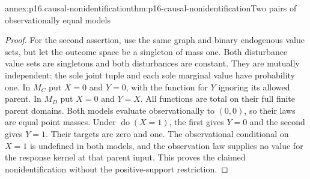 \begin{annexitem}{annex:p16.causal-nonidentification}{thm:p16-causal-nonidentification}{Two pairs of observationally equal models}
\begin{proof}
For the second assertion, use the same graph and binary endogenous value
sets, but let the outcome space be a singleton of mass one. Both
disturbance value sets are singletons and both disturbances are constant.
They are mutually independent: the sole joint tuple and each sole
marginal value have probability one. In \(M_C\) put \(X=0\)
and \(Y=0\), with the function for \(Y\) ignoring its allowed
parent. In \(M_D\) put \(X=0\) and \(Y=X\).
All functions are total on their full finite parent domains.
Both models evaluate observationally to \((0,0)\), so their laws
are equal point masses. Under \(\operatorname{do}(X=1)\), the
first gives \(Y=0\) and the second gives \(Y=1\). Their targets
are zero and one. The observational conditional on \(X=1\) is
undefined in both models, and the observation law supplies no value for
the response kernel at that parent input. This proves the claimed
nonidentification without the positive-support restriction.
\end{proof}
\end{annexitem}

